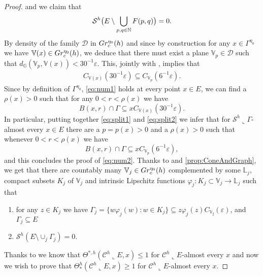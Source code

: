 \documentclass[10pt, a4paper,
oneside, headinclude,footinclude]{scrartcl}
\begin{document}
\begin{proof}
and we claim that
\begin{equation}
    \mathcal{S}^h\big(E\setminus \bigcup_{p,q\in\mathbb{N}} F(p,q)\big)=0.
    \label{eq:num2}
\end{equation}
By density of the family $\mathscr{D}$ in $Gr_c^{\eta_0}(h)$ and since by construction for any $x\in\Gamma^{\eta_0}$ we have $\mathbb V(x)\in Gr_c^{\eta_0}(h)$, we deduce that there must exist a plane $\mathbb V_p\in\mathscr{D}$ such that $d_{\mathbb G}(\mathbb{V}_p,\mathbb{V}(x))<30^{-1}\varepsilon$.
This, jointly with \cite[Lemma 2.15]{antonelli2020rectifiable}, 
implies that
\begin{equation}\label{eq:split1}
\begin{split}
    C_{\mathbb{V}(x)}(30^{-1}\varepsilon) 
    \subseteq C_{\mathbb V_p}(6^{-1}\varepsilon).
    \end{split}
\end{equation}
Since by definition of $\Gamma^{\eta_0}$, \eqref{eq:num1} holds at every point $x\in E$, we can find a $\rho(x)>0$ such that for any $0<r<\rho(x)$ we have
\begin{equation}
     B(x,r)\cap \Gamma\subseteq  xC_{\mathbb{V}(x)}(30^{-1}\varepsilon).
     \label{eq:split2}
\end{equation}
In particular, putting together \eqref{eq:split1} and \eqref{eq:split2} we infer that for $\mathcal{S}^h\llcorner \Gamma$-almost every $x\in E$ there are a $p=p(x)>0$ and a $\rho(x)>0$ such that whenever $0<r<\rho(x)$ we have
$$
B(x,r)\cap \Gamma\subseteq xC_{\mathbb{V}_{p}}(6^{-1}\varepsilon),
$$
and this concludes the proof of \eqref{eq:num2}. Thanks to \cite[Proposition 3.3]{antonelli2020rectifiable} and \cref{prop:ConeAndGraph}, we get that there are countably many $\mathbb{V}_j\in Gr_c^{\eta_0}(h)$ complemented by some $\mathbb{L}_j$, compact subsets $K_j$ of $\mathbb{V}_j$ and intrinsic Lipschitz functions $\varphi_j:K_j\subset\mathbb{V}_j\to\mathbb{L}_j$ such that
\begin{enumerate}
    \item for any $z\in K_j$ we have  $\Gamma_j=\{w\varphi_j(w):w\in K_j\}\subseteq z\varphi_j(z)C_\mathbb{V_j}(\varepsilon)$, and $\Gamma_j\subseteq E$ 
    \item $\mathcal{S}^h(E\setminus \cup_j\Gamma_j)=0$.
\end{enumerate}
Thanks to  \cite[Corollary 4.17]{EdgarCentered} we know that $\Theta^{*,h}(\mathcal{C}^h\llcorner E,x)\leq 1$ for $\mathcal{C}^h\llcorner E$-almost every $x$ and now we wish to prove that $\Theta^{h}_*(\mathcal{C}^h\llcorner E,x)\geq 1$ for $\mathcal{C}^h\llcorner E$-almost every $x$.


\end{proof}
\end{document}
